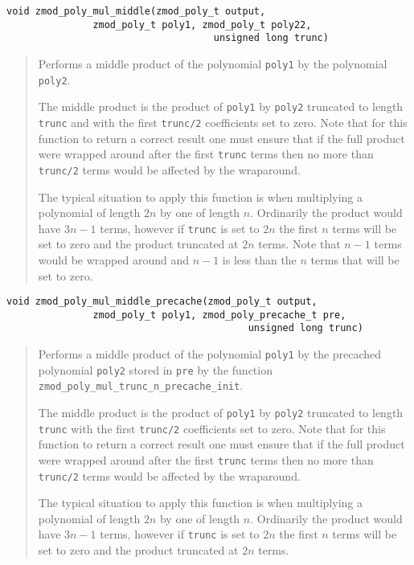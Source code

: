 \documentclass[a4paper,10pt]{article}
\newcommand{\code}{\lstinline}
\begin{document}
\begin{lstlisting}
void zmod_poly_mul_middle(zmod_poly_t output,
               zmod_poly_t poly1, zmod_poly_t poly22,
                                    unsigned long trunc)
\end{lstlisting}
\begin{quote}
Performs a middle product of the polynomial \code{poly1} by the polynomial \code{poly2}.

The middle product is the product of \code{poly1} by \code{poly2} truncated to length \code{trunc} and with the first \code{trunc/2} coefficients set to zero. Note that for this function to return a correct result one must ensure that if the full product were wrapped around after the first \code{trunc} terms then no more than \code{trunc/2} terms would be affected by the wraparound. 

The typical situation to apply this function is when multiplying a polynomial of length $2n$ by one of length $n$. Ordinarily the product would have $3n - 1$ terms, however if \code{trunc} is set to $2n$ the first $n$ terms will be set to zero and the product truncated at $2n$ terms. Note that $n - 1$ terms would be wrapped around and $n-1$ is less than the $n$ terms that will be set to zero.  
\end{quote}

\begin{lstlisting}
void zmod_poly_mul_middle_precache(zmod_poly_t output,
               zmod_poly_t poly1, zmod_poly_precache_t pre,
                                          unsigned long trunc)
\end{lstlisting}
\begin{quote}
Performs a middle product of the polynomial \code{poly1} by the precached polynomial \code{poly2} stored in \code{pre} by the function \code{zmod_poly_mul_trunc_n_precache_init}. 

The middle product is the product of \code{poly1} by \code{poly2} truncated to length \code{trunc} with the first \code{trunc/2} coefficients set to zero. Note that for this function to return a correct result one must ensure that if the full product were wrapped around after the first \code{trunc} terms then no more than \code{trunc/2} terms would be affected by the wraparound. 

The typical situation to apply this function is when multiplying a polynomial of length $2n$ by one of length $n$. Ordinarily the product would have $3n - 1$ terms, however if \code{trunc} is set to $2n$ the first $n$ terms will be set to zero and the product truncated at $2n$ terms.  
\end{quote}
\end{document}
